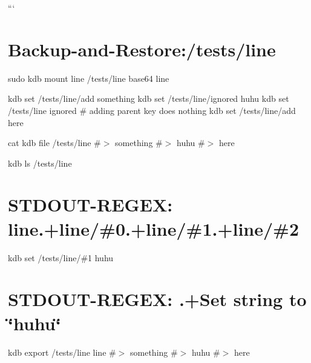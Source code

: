 ``` \hypertarget{autotoc_md346_autotoc_md349}{}\section{Backup-\/and-\/\+Restore\+:/tests/line}\label{autotoc_md346_autotoc_md349}
sudo kdb mount line /tests/line base64 line

kdb set /tests/line/add something kdb set /tests/line/ignored huhu kdb set /tests/line ignored \# adding parent key does nothing kdb set /tests/line/add here

cat {\ttfamily kdb file /tests/line} \#$>$ something \#$>$ huhu \#$>$ here

kdb ls /tests/line \hypertarget{autotoc_md346_autotoc_md350}{}\section{S\+T\+D\+O\+U\+T-\/\+R\+E\+G\+E\+X\+: line.+line/\#0.+line/\#1.+line/\#2}\label{autotoc_md346_autotoc_md350}
kdb set /tests/line/\#1 huhu \hypertarget{autotoc_md346_autotoc_md351}{}\section{S\+T\+D\+O\+U\+T-\/\+R\+E\+G\+E\+X\+: .+\+Set string to \char`\"{}huhu\char`\"{}}\label{autotoc_md346_autotoc_md351}
kdb export /tests/line line \#$>$ something \#$>$ huhu \#$>$ here

